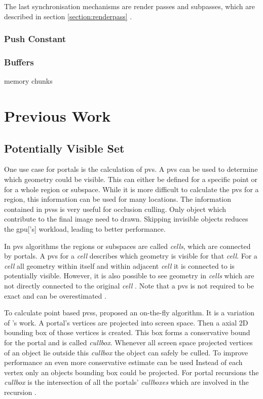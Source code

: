 The last synchronisation mechanisms are render passes and subpasses, which are described in section \ref{section:renderpass} \cite{khronos:vulkan:spec1.1}.

\subsubsection{Push Constant}



\subsubsection{Buffers}
memory chunks






\section{Previous Work}

\subsection{Potentially Visible Set}

One use case for portals is the calculation of \gls{pvs}. A \gls{pvs} can be used to determine which geometry could be visible. This can either be defined for a specific point or for a whole region or subspace. While it is more difficult to calculate the \gls{pvs} for a region, this information can be used for many locations. The information contained in \glspl{pvs} is very useful for occlusion culling. Only object which contribute to the final image need to drawn. Skipping invisible objects reduces the \gls{gpu}['s] workload, leading to better performance.

In \gls{pvs} algorithms the regions or subspaces are called \textit{cells}, which are connected by portals. A \gls{pvs} for a \textit{cell} describes which geometry is visible for that \textit{cell}. For a \textit{cell} all geometry within itself and within adjacent \textit{cell} it is connected to is potentially visible. However, it is also possible to see geometry in \textit{cells} which are not directly connected to the original \textit{cell} . Note that a \gls{pvs} is not required to be exact and can be overestimated \cite{cohen:2003:survey}.

To calculate point based \glspl{pvs}, \textcite{luebke:1995:portals} proposed an on-the-fly algorithm. It is  a variation of \textcite{jones:1971:new}'s work. A portal's vertices are projected into screen space. Then a axial 2D bounding box of those vertices is created. This box forms a conservative bound for the portal and is called  \textit{cullbox}. Whenever all screen space projected vertices of an object lie outside this \textit{cullbox} the object can safely be culled.  To improve performance an even more conservative estimate can be used Instead of each vertex only an objects bounding box could be projected.  For portal recursions the \textit{cullbox} is the intersection of all the portals' \textit{cullboxes} which are involved in the recursion \cite{luebke:1995:portals}. 


